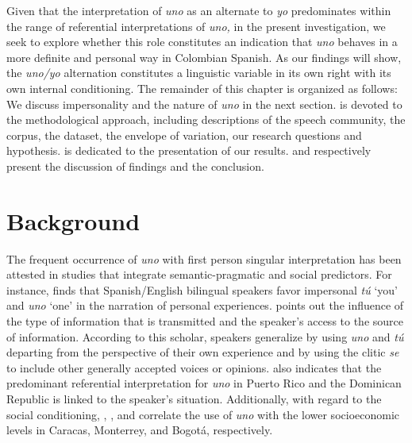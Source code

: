 \documentclass[output=paper]{langscibook}
\begin{document}
Given that the interpretation of \textit{uno} as an alternate to \textit{yo} predominates within the range of referential interpretations of \textit{uno,} in the present investigation, we seek to explore whether this role constitutes an indication that \textit{uno} behaves in a more definite and personal way in Colombian Spanish. As our findings will show, the \textit{uno/yo} alternation constitutes a linguistic variable in its own right with its own internal conditioning. The remainder of this chapter is organized as follows: We discuss impersonality and the nature of \textit{uno} in the next section.  is devoted to the methodological approach, including descriptions of the speech community, the corpus, the dataset, the envelope of variation, our research questions and hypothesis.  is dedicated to the presentation of our results.  and  respectively present the discussion of findings and the conclusion.  



\section{Background}\label{sec:orozco:2}


The frequent occurrence of \textit{uno} with first person singular interpretation has been attested in studies that integrate semantic-pragmatic and social predictors. For instance, \citet{Morales1995} finds that Spanish/English bilingual speakers favor impersonal \textit{tú} ‘you’ and \textit{uno} ‘one’ in the narration of personal experiences. \citet{Fernández2008} points out the influence of the type of information that is transmitted and the speaker’s access to the source of information. According to this scholar, speakers generalize by using \textit{uno} and \textit{tú} departing from the perspective of their own experience and by using the clitic \textit{se} to include other generally accepted voices or opinions. \citet{BassaVanrell2013} also indicates that the predominant referential interpretation for \textit{uno} in Puerto Rico and the Dominican Republic is linked to the speaker’s situation. Additionally, with regard to the social conditioning, \citet{Guirado2011},  \citet{RodríguezAlfano2004}, and \citet{GuantivaAcosta2000} correlate the use of \textit{uno} with the lower socioeconomic levels in Caracas, Monterrey, and Bogotá, respectively. 
\end{document}
